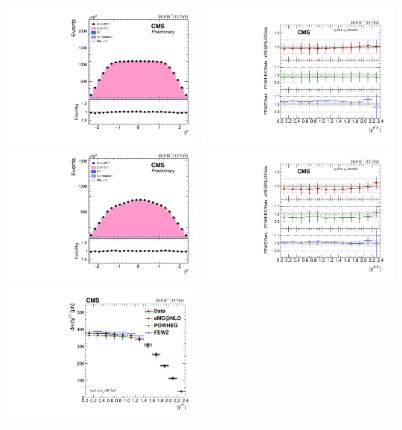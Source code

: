 \begin{figure}
	\centering
        \includegraphics[width=0.45\textwidth]{figures/zpt/zmm_rap.pdf}
	\includegraphics[width=0.45\textwidth]{figures/zpt/zmm_rap_ratio.pdf}
	\includegraphics[width=0.45\textwidth]{figures/zpt/zee_rap.pdf}
	\includegraphics[width=0.45\textwidth]{figures/zpt/zee_rap_ratio.pdf}
	\includegraphics[width=0.45\textwidth]{figures/zpt/zll_rap.pdf}     

\end{figure}
